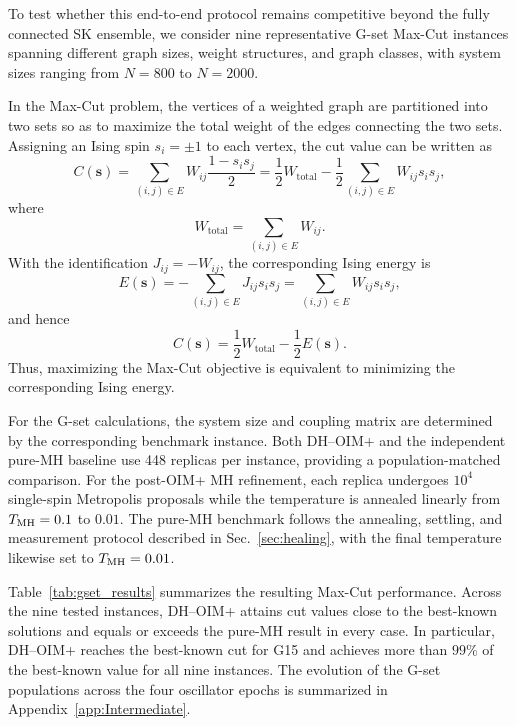 \documentclass[
reprint,
amsmath,amssymb,
aps,
pre,
floatfix,
]{revtex4-2}
\begin{document}
To test whether this end-to-end protocol remains competitive beyond the
fully connected SK ensemble, we consider nine representative G-set Max-Cut
instances spanning different graph sizes, weight structures, and graph
classes, with system sizes ranging from $N=800$ to $N=2000$.

In the Max-Cut problem, the vertices of a weighted graph are partitioned
into two sets so as to maximize the total weight of the edges connecting
the two sets. Assigning an Ising spin $s_i=\pm1$ to each vertex, the cut
value can be written as~\cite{Lucas_2014,OIM}
\begin{equation}
C(\mathbf{s})
=
\sum_{(i,j)\in E}
W_{ij}\frac{1-s_i s_j}{2}
=
\frac{1}{2}W_{\mathrm{total}}
-
\frac{1}{2}
\sum_{(i,j)\in E}W_{ij}s_i s_j ,
\end{equation}
where
\begin{equation}
W_{\mathrm{total}}
=
\sum_{(i,j)\in E}W_{ij}.
\end{equation}
With the identification $J_{ij}=-W_{ij}$, the corresponding Ising energy is
\begin{equation}
E(\mathbf{s})
=
-\sum_{(i,j)\in E}J_{ij}s_i s_j
=
\sum_{(i,j)\in E}W_{ij}s_i s_j ,
\end{equation}
and hence
\begin{equation}
C(\mathbf{s})
=
\frac{1}{2}W_{\mathrm{total}}
-
\frac{1}{2}E(\mathbf{s}).
\end{equation}
Thus, maximizing the Max-Cut objective is equivalent to minimizing the
corresponding Ising energy.


For the G-set calculations, the system size and coupling matrix are determined
by the corresponding benchmark instance. Both DH--OIM+ and the independent
pure-MH baseline use 448 replicas per instance, providing a population-matched
comparison. For the post-OIM+ MH refinement, each replica undergoes
$10^4$ single-spin Metropolis proposals while the temperature is annealed
linearly from $T_{\rm MH}=0.1$ to $0.01$. The pure-MH benchmark follows the
annealing, settling, and measurement protocol described in Sec.~\ref{sec:healing}, with
the final temperature likewise set to $T_{\rm MH}=0.01$.

Table~\ref{tab:gset_results} summarizes the resulting Max-Cut performance.
Across the nine tested instances, DH--OIM+ attains cut values close to the
best-known solutions and equals or exceeds the pure-MH result in every
case. In particular, DH--OIM+ reaches the best-known cut for G15 and
achieves more than $99\%$ of the best-known value for all nine instances.
The evolution of the G-set populations across the four oscillator epochs
is summarized in Appendix~\ref{app:Intermediate}.
\end{document}

